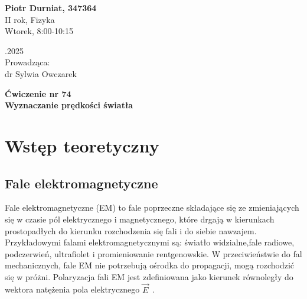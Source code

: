 \documentclass[a4paper,12pt]{article}
\begin{document}
\noindent
\begin{minipage}{0.5\textwidth}
    \raggedright
    \textbf{Piotr Durniat, 347364} \\
    II rok, Fizyka \\
    Wtorek, 8:00-10:15 \\
    \vspace{0.5cm}
    \vspace{0.5cm}
\end{minipage}%
\begin{minipage}{0.5\textwidth}
    .2025 \\
    \vspace{0.5cm}
    Prowadząca: \\
    dr Sylwia Owczarek
\end{minipage}

\vspace{2cm}
\begin{center}
    \LARGE \textbf{Ćwiczenie nr 74} \\[0.5cm]
    \Large \textbf{Wyznaczanie prędkości światła}
\end{center}

\vspace{1cm} %
\noindent


\section{Wstęp teoretyczny}

\subsection*{Fale elektromagnetyczne}

Fale elektromagnetyczne (EM) to fale poprzeczne składające się ze zmieniających się w czasie pól elektrycznego i magnetycznego, które drgają w kierunkach prostopadłych do kierunku rozchodzenia się fali i do siebie nawzajem.
Przykładowymi falami elektromagnetycznymi są: światło widzialne,fale radiowe, podczerwień, ultrafiolet i promieniowanie rentgenowskie.
W przeciwieństwie do fal mechanicznych, fale EM nie potrzebują ośrodka do propagacji, mogą rozchodzić się w próżni.
Polaryzacja fali EM jest zdefiniowana jako kierunek równoległy do wektora natężenia pola elektrycznego $\vec{E}$~\citep{fizyka_dla_szkol_wyzszych_tom_3}.
\end{document}
